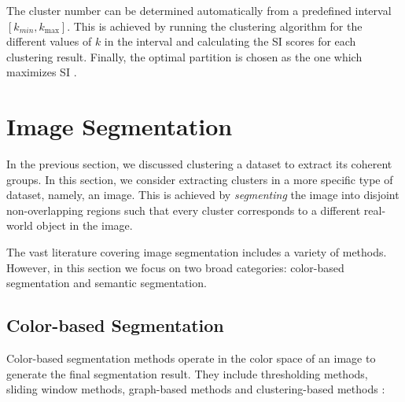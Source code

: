 The cluster number can be determined automatically from a predefined interval $[k_{min}, k_{\text{max}}]$. This is achieved by running the clustering algorithm for the different values of $k$ in the interval and calculating the SI scores for each clustering result. Finally, the optimal partition is chosen as the one which maximizes SI \parencite{bocking2018determining}.

\section{Image Segmentation}

In the previous section, we discussed clustering a dataset to extract its coherent groups. In this section, we consider extracting clusters in a more specific type of dataset, namely, an image. This is achieved by \emph{segmenting} the image into disjoint non-overlapping regions such that every cluster corresponds to a different real-world object in the image.

The vast literature covering image segmentation includes a variety of methods. However, in this section we focus on two broad categories: color-based segmentation and semantic segmentation.

\subsection{Color-based Segmentation}\label{subsection:color_based_segmentation}

Color-based segmentation methods operate in the color space of an image to generate the final segmentation result. They include thresholding methods, sliding window methods, graph-based methods and clustering-based methods \parencite{dhanachandra2017survey}:

